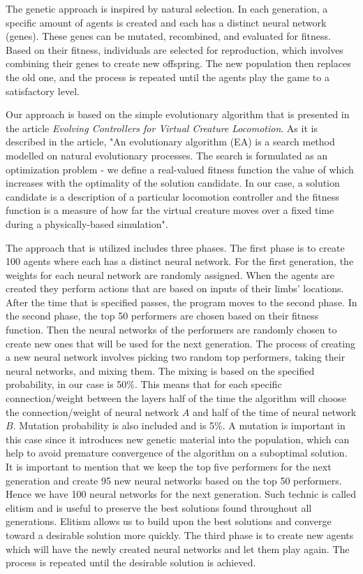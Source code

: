 \documentclass[letterpaper]{article} %
\begin{document}
The genetic approach is inspired by natural selection. In each generation, a specific amount of agents is created and each has a distinct neural network (genes). These genes can be mutated, recombined, and evaluated for fitness. Based on their fitness, individuals are selected for reproduction, which involves combining their genes to create new offspring. The new population then replaces the old one, and the process is repeated until the agents play the game to a satisfactory level.

\par Our approach is based on the simple evolutionary algorithm that is presented in the article \textit{Evolving Controllers for Virtual Creature Locomotion}. As it is described in the article, "An evolutionary algorithm (EA) is a search method modelled on natural evolutionary processes. The search is formulated as an optimization problem - we define a real-valued fitness function the value of which increases with the optimality of the solution candidate. In our case, a solution candidate is a description of a particular locomotion controller and the fitness function is a measure of how far the virtual creature moves over a fixed time during a physically-based simulation"\cite{sanders_lobb_riddle_2003}.

\par The approach that is utilized includes three phases. The first phase is to create 100 agents where each has a distinct neural network. For the first generation, the weights for each neural network are randomly assigned. When the agents are created they perform actions that are based on inputs of their limbs' locations. After the time that is specified passes, the program moves to the second phase. In the second phase, the top 50 performers are chosen based on their fitness function. Then the neural networks of the performers are randomly chosen to create new ones that will be used for the next generation. The process of creating a new neural network involves picking two random top performers, taking their neural networks, and mixing them. The mixing is based on the specified probability, in our case is 50\%. This means that for each specific connection/weight between the layers half of the time the algorithm will choose the connection/weight of neural network $A$ and half of the time of neural network $B$. Mutation probability is also included and is 5\%. A mutation is important in this case since it introduces new genetic material into the population, which can help to avoid premature convergence of the algorithm on a suboptimal solution. It is important to mention that we keep the top five performers for the next generation and create 95 new neural networks based on the top 50 performers. Hence we have 100 neural networks for the next generation. Such technic is called elitism and is useful to preserve the best solutions found throughout all generations. Elitism allows us to build upon the best solutions and converge toward a desirable solution more quickly. The third phase is to create new agents which will have the newly created neural networks and let them play again. The process is repeated until the desirable solution is achieved.
\end{document}
